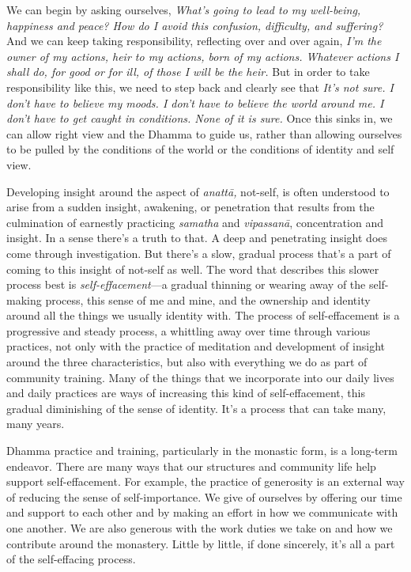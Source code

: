 We can begin by asking ourselves, \emph{What's going to lead to my 
well-being, happiness and peace? How do I avoid this confusion, 
difficulty, and suffering?} And we can keep taking responsibility, 
reflecting over and over again, \emph{I'm the owner of my actions, heir 
to my actions, born of my actions. Whatever actions I shall do, for 
good or for ill, of those I will be the heir.} But in order to take 
responsibility like this, we need to step back and clearly see that 
\emph{It's not sure. I don't have to believe my moods. I don't have to 
believe the world around me. I don't have to get caught in conditions. 
None of it is sure.} Once this sinks in, we can allow right view and 
the Dhamma to guide us, rather than allowing ourselves to be pulled by 
the conditions of the world or the conditions of identity and self view.


Developing insight around the aspect of \emph{anattā,} not-self, is 
often understood to arise from a sudden insight, awakening, or 
penetration that results from the culmination of earnestly practicing 
\emph{samatha} and \emph{vipassanā}, concentration and insight. In a 
sense there's a truth to that. A deep and penetrating insight does come 
through investigation. But there's a slow, gradual process that's a 
part of coming to this insight of not-self as well. The word that 
describes this slower process best is \emph{self-effacement}---a 
gradual thinning or wearing away of the self-making process, this sense 
of me and mine, and the ownership and identity around all the things we 
usually identity with. The process of self-effacement is a progressive 
and steady process, a whittling away over time through various 
practices, not only with the practice of meditation and development of 
insight around the three characteristics, but also with everything we 
do as part of community training. Many of the things that we 
incorporate into our daily lives and daily practices are ways of 
increasing this kind of self-effacement, this gradual diminishing of 
the sense of identity. It's a process that can take many, many years.

Dhamma practice and training, particularly in the monastic form, is a 
long-term endeavor. There are many ways that our structures and 
community life help support self-effacement. For example, the practice 
of generosity is an external way of reducing the sense of 
self-importance. We give of ourselves by offering our time and support 
to each other and by making an effort in how we communicate with one 
another. We are also generous with the work duties we take on and how 
we contribute around the monastery. Little by little, if done 
sincerely, it's all a part of the self-effacing process.

